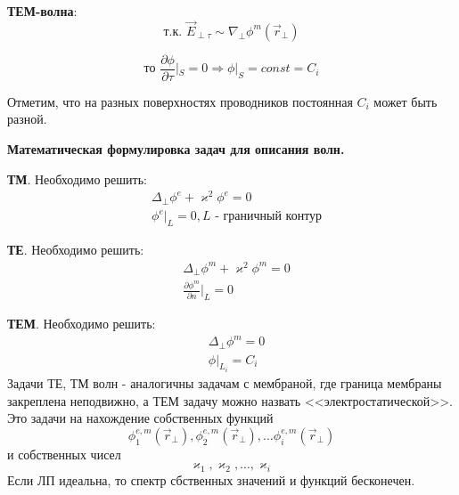 \textbf{ТЕМ-волна}:
\begin{equation}
  \text{т.к. }\vec{E}_{\perp \tau}\sim \nabla_{\perp} \phi^m(\vec{r}_{\perp}) 
\end{equation}

\begin{equation}
  \text{то }\frac{\partial \phi}{\partial \tau}|_S = 0 \Rightarrow \phi|_S = const = C_i
\end{equation}

Отметим, что на разных поверхностях проводников постоянная $C_i$ может быть разной.

\textbf{Математическая формулировка задач для описания волн.}

\textbf{ТМ}. Необходимо решить:
\begin{align*}
  &\Delta_{\perp}\phi^{e}+\varkappa^2\phi^{e}=0\\
  &\phi^e|_L = 0 , \text{$L$ - граничный контур}
\end{align*}

\textbf{ТЕ}. Необходимо решить:
\begin{align*}
  &\Delta_{\perp}\phi^{m}+\varkappa^2\phi^{m}=0\\
  &\frac{\partial \phi^m}{\partial n}|_L = 0
\end{align*}

\textbf{ТЕМ}. Необходимо решить:
\begin{align*}
  &\Delta_{\perp}\phi^{m}=0\\
  &\phi|_{L_i} = C_i
\end{align*}
Задачи ТЕ, ТМ волн - аналогичны задачам с мембраной, где граница мембраны закреплена неподвижно, а ТЕМ задачу можно
назвать <<электростатической>>.
Это задачи на нахождение собственных функций
\begin{equation}
  \phi^{e,m}_1(\vec{r}_{\perp}),\phi^{e,m}_2(\vec{r}_{\perp}),\dots \phi^{e,m}_i(\vec{r}_{\perp})      
\end{equation}
и собственных чисел 
\begin{equation}
\varkappa_1,\varkappa_2,\dots,\varkappa_i  
\end{equation}
Если ЛП идеальна, то спектр сбственных значений и функций бесконечен.